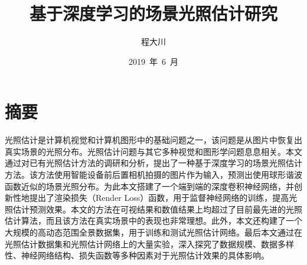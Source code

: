\confidential{}%
\title{基于深度学习的场景光照估计研究}%
\author{程大川}%
\date{2019~年~6~月}%
\maketitle%
\MAKETITLE%
\makedeclaration%
\chapter*{摘\quad 要}
\setcounter{page}{1}%
光照估计是计算机视觉和计算机图形中的基础问题之一，该问题是从图片中恢复出真实场景的光照分布。光照估计问题与其它多种视觉和图形学问题息息相关。本文通过对已有光照估计方法的调研和分析，提出了一种基于深度学习的场景光照估计方法。该方法使用智能设备前后置相机拍摄的图片作为输入，预测出使用球形谐波函数近似的场景光照分布。为此本文搭建了一个端到端的深度卷积神经网络，并创新性地提出了渲染损失（Render Loss）函数，用于监督神经网络的训练，提高光照估计预测效果。本文的方法在可视结果和数值结果上均超过了目前最先进的光照估计算法，而且该方法在真实场景中的表现也非常理想。此外，本文还构建了一个大规模的高动态范围全景数据集，用于训练和测试光照估计网络。最后本文通过在光照估计数据集和光照估计网络上的大量实验，深入探究了数据规模、数据多样性、神经网络结构、损失函数等多种因素对于光照估计效果的具体影响。

